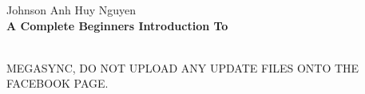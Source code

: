%
%
%
% 
%

\begin{titlepage}
\newenvironment{bottompar}{\par\vspace*{\fill}}{\clearpage}

\raggedleft %
\vspace*{\baselineskip} %

{\Large Johnson Anh Huy Nguyen}\\[0.167\textheight] %

{\LARGE\bfseries A Complete Beginners Introduction To}\\[\baselineskip] %

{\color{red}{\Huge Cavity Enhanced Absorption Spectroscopy}}\\[\baselineskip] %

\vfill %

\vspace*{3\baselineskip} %
\flushleft
MEGASYNC, DO NOT UPLOAD ANY UPDATE FILES ONTO THE FACEBOOK PAGE.
\end{titlepage}

